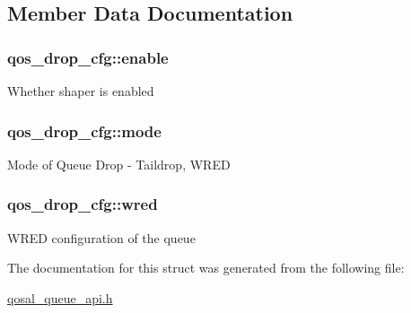 \subsection{Member Data Documentation}
\hypertarget{structqos__drop__cfg_a340f96cb4ea99e2bd2b0e07c56d0d174}{
\subsubsection[{enable}]{ qos\-\_\-drop\-\_\-cfg\-::enable}}\label{structqos__drop__cfg_a340f96cb4ea99e2bd2b0e07c56d0d174}
Whether shaper is enabled \hypertarget{structqos__drop__cfg_aaebe1a62494df9083589c0d339f8e96b}{
\subsubsection[{mode}]{ qos\-\_\-drop\-\_\-cfg\-::mode}}\label{structqos__drop__cfg_aaebe1a62494df9083589c0d339f8e96b}
Mode of Queue Drop -\/ Taildrop, W\-R\-E\-D \hypertarget{structqos__drop__cfg_a9db647852861e7763da396270d1e1232}{
\subsubsection[{wred}]{ qos\-\_\-drop\-\_\-cfg\-::wred}}\label{structqos__drop__cfg_a9db647852861e7763da396270d1e1232}
W\-R\-E\-D configuration of the queue 

The documentation for this struct was generated from the following file\-:\begin{DoxyCompactItemize}
\item 
\hyperlink{qosal__queue__api_8h}{qosal\-\_\-queue\-\_\-api.\-h}\end{DoxyCompactItemize}
